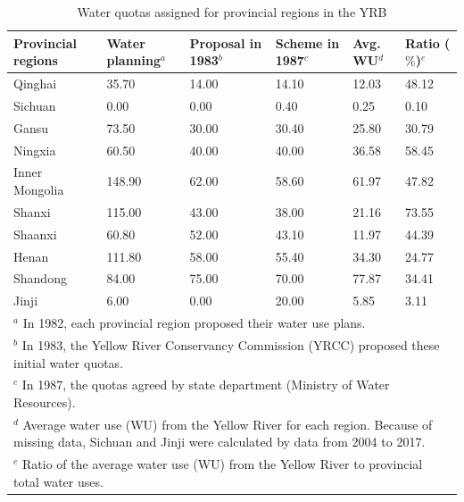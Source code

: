 \documentclass[preprint, 12pt]{elsarticle}
\begin{document}
\begin{table}[htbp]\footnotesize
	\centering
	\caption{Water quotas assigned for provincial regions in the YRB}\label{tab:quota}
	  \begin{tabularx}{\textwidth}{p{3cm}XXXXX}
	  \toprule
	  Provincial regions & \multicolumn{1}{l}{Water planning$^a$} & \multicolumn{1}{l}{Proposal in 1983$^b$} & \multicolumn{1}{l}{Scheme in 1987$^c$} & \multicolumn{1}{l}{Avg. WU$^d$} & \multicolumn{1}{l}{Ratio ($\%$)$^e$} \\
	  \midrule
	  Qinghai & 35.70  & 14.00  & 14.10  & 12.03  & 48.12  \\
	  Sichuan & 0.00  & 0.00  & 0.40  & 0.25  & 0.10  \\
	  Gansu & 73.50  & 30.00  & 30.40  & 25.80  & 30.79  \\
	  Ningxia & 60.50  & 40.00  & 40.00  & 36.58  & 58.45  \\
	  Inner Mongolia & 148.90  & 62.00  & 58.60  & 61.97  & 47.82  \\
	  Shanxi & 115.00  & 43.00  & 38.00  & 21.16  & 73.55  \\
	  Shaanxi & 60.80  & 52.00  & 43.10  & 11.97  & 44.39  \\
	  Henan & 111.80  & 58.00  & 55.40  & 34.30  & 24.77  \\
	  Shandong & 84.00  & 75.00  & 70.00  & 77.87  & 34.41  \\
	  Jinji & 6.00  & 0.00  & 20.00  & 5.85  & 3.11  \\
	  \bottomrule
	  \multicolumn{6}{p{\textwidth}}{$^a$ In 1982, each provincial region proposed their water use plans.}\\
	  \multicolumn{6}{p{\textwidth}}{$^b$ In 1983, the Yellow River Conservancy Commission (YRCC) proposed these initial water quotas.}\\
	  \multicolumn{6}{p{\textwidth}}{$^c$ In 1987, the quotas agreed by state department (Ministry of Water Resources).}\\
	  \multicolumn{6}{p{\textwidth}}{$^d$ Average water use (WU) from the Yellow River for each region. Because of missing data, Sichuan and Jinji were calculated by data from 2004 to 2017.}\\
	  \multicolumn{6}{p{\textwidth}}{$^e$ Ratio of the average water use (WU) from the Yellow River to provincial total water uses.}\\
	  \end{tabularx}\\
\end{table}
\end{document}
